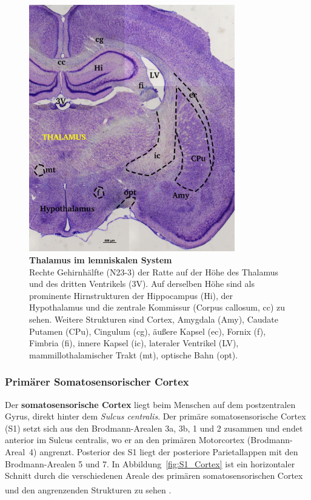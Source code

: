 \documentclass[12pt,a4paper,pdftex]{article}
\begin{document}
\begin{figure}[H]
    \centering
    \includegraphics[width = 0.8\textwidth]
    {pictures/somatosensory/thalamus_somato.png}
    \caption[Thalamus im lemniskalen System]{\textbf{Thalamus im lemniskalen System}\\
    Rechte Gehirnhälfte (N23-3) der Ratte auf der Höhe des Thalamus und des dritten Ventrikels (3V). Auf derselben Höhe sind als prominente Hirnstrukturen der Hippocampus (Hi), der Hypothalamus und die zentrale Kommissur (Corpus callosum, cc) zu sehen. Weitere Strukturen sind Cortex, Amygdala (Amy), Caudate Putamen (CPu), Cingulum (cg), äußere Kapsel (ec), Fornix (f), Fimbria (fi), innere Kapsel (ic), lateraler Ventrikel (LV), mammillothalamischer Trakt (mt), optische Bahn (opt).}
    \label{fig:thalamus_somato}
\end{figure}

\subsubsection*{Primärer Somatosensorischer Cortex}
\label{subsubsec:S1}
Der \textbf{somatosensorische Cortex}  liegt beim Menschen auf dem postzentralen Gyrus, direkt hinter dem \textit{Sulcus centralis}. Der primäre somatosensorische Cortex (S1) setzt sich aus den Brodmann-Arealen 3a, 3b, 1 und 2 zusammen und endet anterior im Sulcus centralis, wo er an den primären Motorcortex (Brodmann-Areal~4) angrenzt. Posterior des S1 liegt der posteriore Parietallappen mit den Brodmann-Arealen 5 und 7. In Abbildung~\ref{fig:S1_Cortex} ist ein horizontaler Schnitt durch die verschiedenen Areale des primären somatosensorischen Cortex und den angrenzenden Strukturen zu sehen \textsuperscript{\cite[23]{kandel2013principles}}. 
\end{document}
